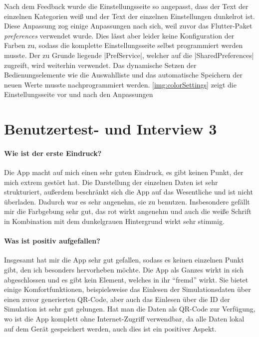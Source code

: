 	Nach dem Feedback wurde die Einstellungsseite so angepasst, dass der Text der einzelnen Kategorien weiß und der Text der einzelnen Einstellungen dunkelrot ist. Diese Anpassung zog einige Anpassungen nach sich, weil zuvor das Flutter-Paket \textit{preferences} verwendet wurde. Dies lässt aber leider keine Konfiguration der Farben zu, sodass die komplette Einstellungsseite selbst programmiert werden musste. Der zu Grunde liegende |PrefService|, welcher auf die |SharedPreferences| zugreift, wird weiterhin verwendet. Das dynamische Setzen der Bedienungselemente wie die Auswahlliste und das automatische Speichern der neuen Werte musste nachprogrammiert werden. \cref{img:colorSettings} zeigt die Einstellungsseite vor und nach den Anpassungen
	
	
	\section{Benutzertest- und Interview 3}
	\label{sec:flinterview3}
	
	\paragraph{Wie ist der erste Eindruck?}
	
		Die App macht auf mich einen sehr guten Eindruck, es gibt keinen Punkt, der mich extrem gestört hat. Die Darstellung der einzelnen Daten ist sehr strukturiert, außerdem beschränkt sich die App auf das Wesentliche und ist nicht überladen. Dadurch war es sehr angenehm, sie zu benutzen. Insbesondere gefällt mir die Farbgebung sehr gut, das rot wirkt angenehm und auch die weiße Schrift in Kombination mit dem dunkelgrauen Hintergrund wirkt sehr stimmig.
	
	\paragraph{Was ist positiv aufgefallen?}
		
		Insgesamt hat mir die App sehr gut gefallen, sodass es keinen einzelnen Punkt gibt, den ich besonders hervorheben möchte. Die App als Ganzes wirkt in sich abgeschlossen und es gibt kein Element, welches in ihr ``fremd'' wirkt. Sie bietet einige Komfortfunktionen, beispielsweise das Einlesen der Simulationsdaten über einen zuvor generierten QR-Code, aber auch das Einlesen über die ID der Simulation ist sehr gut gelungen. Hat man die Daten als QR-Code zur Verfügung, wo ist die App komplett ohne Internet-Zugriff verwendbar, da alle Daten lokal auf dem Gerät gespeichert werden, auch dies ist ein positiver Aspekt.
	
